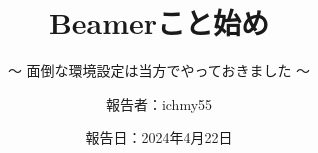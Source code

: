 %
\title{Beamerこと始め}
\subtitle{～ 面倒な環境設定は当方でやっておきました ～}
%
%
%
\date[Apr.22nd,2024]{報告日：2024年4月22日}
\author[ichmy55]{報告者：ichmy55}
\subject{Usage example of PrePoMax}
